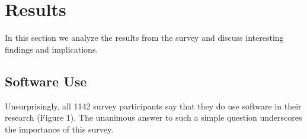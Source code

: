 \section{Results}
\label{sec:res}

In this section we analyze the results from the survey and discuss interesting findings and implications.

\subsection{Software Use}
Unsurprisingly, all 1142 survey participants say that they do use software in their research (Figure 1). The unanimous answer to such a simple question underscores the importance of this survey.